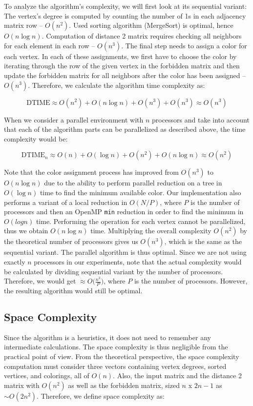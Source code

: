 \documentclass[11pt,a4paper]{article}
\begin{document}
To analyze the algorithm's complexity, we will first look at its sequential variant: The vertex's degree is computed by counting the number of 1s in each adjacency matrix row -- $O(n^2)$. Used sorting algorithm (MergeSort) is optimal, hence $O(n \log n)$. Computation of distance 2 matrix requires checking all neighbors for each element in each row -- $O(n^3)$. The final step needs to assign a color for each vertex. In each of these assignments, we first have to choose the color by iterating through the row of the given vertex in the forbidden matrix and then update the forbidden matrix for all neighbors after the color has been assigned -- $O(n^3)$. Therefore, we calculate the algorithm time complexity as:

$$\textrm{DTIME} \approx O(n^2) + O(n \log n) + O(n^3) + O(n^3) \approx O(n^3)$$

When we consider a parallel environment with $n$ processors and take into account that each of the algorithm parts can be parallelized as described above, the time complexity would be:

$$\textrm{DTIME}_n \approx O(n) + O(\log n) + O(n^2) + O(n \log n) \approx O(n^2)$$

Note that the color assignment process has improved from $O(n^3)$ to $O(n \log n)$ due to the ability to perform parallel reduction on a tree in $O(\log n)$ time to find the minimum available color. Our implementation also performs a variant of a local reduction in $O(N/P)$, where $P$ is the number of processors and then an OpenMP \texttt{min} reduction in order to find the minimum in $O(log n)$ time. Performing the operation for each vertex cannot be parallelized, thus we obtain $O(n \log n)$ time. Multiplying the overall complexity $O(n^2)$ by the theoretical number of processors gives us $O(n^3)$, which is the same as the sequential variant. The parallel algorithm is thus optimal. Since we are not using exactly $n$ processors in our experiments, note that the actual complexity would be calculated by dividing sequential variant by the number of processors. Therefore, we would get $\approx O\Big(\frac{n^3}{P}\Big)$, where $P$ is the number of processors. However, the resulting algorithm would still be optimal.

\subsection{Space Complexity}
\label{ssec:parallel_spaceComplex}

Since the algorithm is a heuristics, it does not need to remember any intermediate calculations. The space complexity is thus negligible from the practical point of view. From the theoretical perspective, the space complexity computation must consider three vectors containing vertex degrees, sorted vertices, and colorings, all of $O(n)$. Also, the input matrix and the distance 2 matrix with $O(n^2)$ as well as the forbidden matrix, sized $n$ x $2n -1$ as $\sim O(2n^2)$. Therefore, we define space complexity as:
\end{document}

